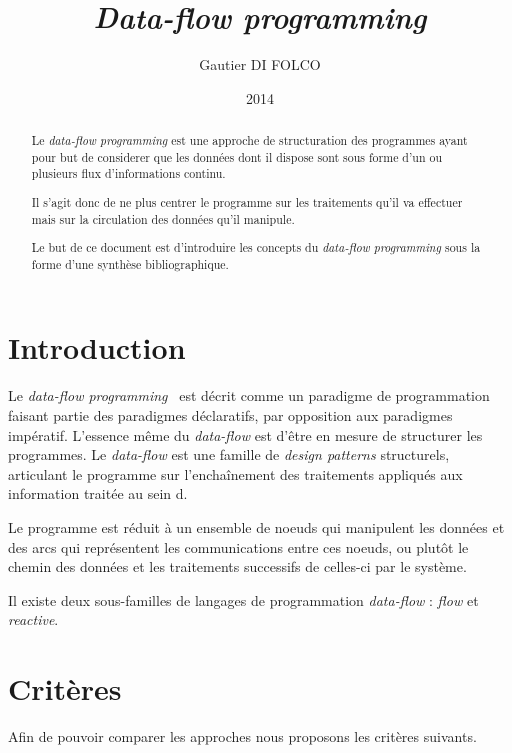\documentclass{article}
\title{\emph{Data-flow programming}}
\author{Gautier DI FOLCO}
\date{2014}
\begin{document}
\maketitle
\tableofcontents

\begin{abstract}
Le \emph{data-flow programming} est une approche de structuration des programmes
ayant pour but de considerer que les données dont il dispose sont sous forme
d'un ou plusieurs flux d'informations continu.

Il s'agit donc de ne plus centrer le programme sur les traitements qu'il va
effectuer mais sur la circulation des données qu'il manipule.

Le but de ce document est d'introduire les concepts du \emph{data-flow programming}
sous la forme d'une synthèse bibliographique.
\end{abstract}

\section{Introduction}\label{introduction}

Le \emph{data-flow programming}~\cite{dataflow} est décrit comme un paradigme de
programmation faisant partie des paradigmes déclaratifs, par opposition
aux paradigmes impératif.
L'essence même du \emph{data-flow} est d'être en mesure de structurer
les programmes.
Le \emph{data-flow} est une famille de \emph{design patterns} structurels,
articulant le programme sur l'enchaînement des
traitements appliqués aux information traitée au sein d.

Le programme est réduit à un ensemble de noeuds qui
manipulent les données et des arcs qui représentent les
communications entre ces noeuds, ou plutôt le chemin des
données et les traitements successifs de celles-ci par le système.

Il existe deux sous-familles de langages de programmation \emph{data-flow} :
\emph{flow} et \emph{reactive}. 

\section{Critères}\label{criteres}
Afin de pouvoir comparer les approches nous proposons les critères suivants.
\end{document}
